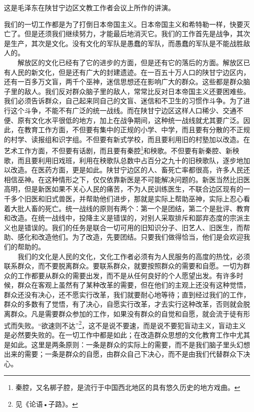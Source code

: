 \documentclass[cn,11pt,chinese]{elegantbook}
\begin{document}
\begin{introduction}\item  这是毛泽东在陕甘宁边区文教工作者会议上所作的讲演。\end{introduction}
我们的一切工作都是为了打倒日本帝国主义。日本帝国主义和希特勒一样，快要灭亡了。但是还须我们继续努力，才能最后地消灭它。我们的工作首先是战争，其次是生产，其次是文化。没有文化的军队是愚蠢的军队，而愚蠢的军队是不能战胜敌人的。\\
　　解放区的文化已经有了它的进步的方面，但是还有它的落后的方面。解放区已有人民的新文化，但是还有广大的封建遗迹。在一百五十万人口的陕甘宁边区内，还有一百多万文盲，两千个巫神，迷信思想还在影响广大的群众。这些都是群众脑子里的敌人。我们反对群众脑子里的敌人，常常比反对日本帝国主义还要困难些。我们必须告诉群众，自己起来同自己的文盲、迷信和不卫生的习惯作斗争。为了进行这个斗争，不能不有广泛的统一战线。而在陕甘宁边区这样人口稀少、交通不便、原有文化水平很低的地方，加上在战争期间，这种统一战线就尤其要广泛。因此，在教育工作方面，不但要有集中的正规的小学、中学，而且要有分散的不正规的村学、读报组和识字组。不但要有新式学校，而且要利用旧的村塾加以改造。在艺术工作方面，不但要有话剧，而且要有秦腔\footnote[1]{ 秦腔，又名梆子腔，是流行于中国西北地区的具有悠久历史的地方戏曲。}和秧歌。不但要有新秦腔、新秧歌，而且要利用旧戏班，利用在秧歌队总数中占百分之九十的旧秧歌队，逐步地加以改造。在医药方面，更是如此。陕甘宁边区的人、畜死亡率都很高，许多人民还相信巫神。在这种情形之下，仅仅依靠新医是不可能解决问题的。新医当然比旧医高明，但是新医如果不关心人民的痛苦，不为人民训练医生，不联合边区现有的一千多个旧医和旧式兽医，并帮助他们进步，那就是实际上帮助巫神，实际上忍心看着大批人畜的死亡。统一战线的原则有两个：第一个是团结，第二个是批评、教育和改造。在统一战线中，投降主义是错误的，对别人采取排斥和鄙弃态度的宗派主义也是错误的。我们的任务是联合一切可用的旧知识分子、旧艺人、旧医生，而帮助、感化和改造他们。为了改造，先要团结。只要我们做得恰当，他们是会欢迎我们的帮助的。\\
　　我们的文化是人民的文化，文化工作者必须有为人民服务的高度的热忱，必须联系群众，而不要脱离群众。要联系群众，就要按照群众的需要和自愿。一切为群众的工作都要从群众的需要出发，而不是从任何良好的个人愿望出发。有许多时候，群众在客观上虽然有了某种改革的需要，但在他们的主观上还没有这种觉悟，群众还没有决心，还不愿实行改革，我们就要耐心地等待；直到经过我们的工作，群众的多数有了觉悟，有了决心，自愿实行改革，才去实行这种改革，否则就会脱离群众。凡是需要群众参加的工作，如果没有群众的自觉和自愿，就会流于徒有形式而失败。“欲速则不达”\footnote[2]{ 见《论语•子路》。}，这不是说不要速，而是说不要犯盲动主义，盲动主义是必然要失败的。在一切工作中都是如此；在改造群众思想的文化教育工作中尤其是如此。这里是两条原则：一条是群众的实际上的需要，而不是我们脑子里头幻想出来的需要；一条是群众的自愿，由群众自己下决心，而不是由我们代替群众下决心。\\
\end{document}
